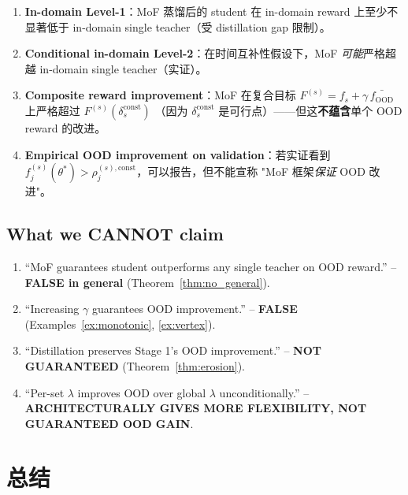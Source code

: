 \documentclass[11pt,a4paper]{article}
\newcommand{\OOD}{\mathrm{OOD}}
\newcommand{\const}{\mathrm{const}}
\theoremstyle{definition}
\begin{document}
\begin{tcolorbox}[colback=green!5,colframe=green!50!black,title=\textbf{Safe Claims}]
\begin{enumerate}[leftmargin=1.5em]
\item \textbf{In-domain Level-1}：MoF 蒸馏后的 student 在 in-domain reward
上至少不显著低于 in-domain single teacher（受 distillation gap 限制）。
\item \textbf{Conditional in-domain Level-2}：在时间互补性假设下，MoF
\emph{可能}严格超越 in-domain single teacher（实证）。
\item \textbf{Composite reward improvement}：MoF 在复合目标
$F^{(s)} = f_s + \gamma\,\bar{f_{\OOD}}$ 上严格超过 $F^{(s)}(\delta_s^\const)$
（因为 $\delta_s^\const$ 是可行点）——但这\textbf{不蕴含}单个 OOD reward 的改进。
\item \textbf{Empirical OOD improvement on validation}：若实证看到
$f_j^{(s)}(\theta^*) > \rho_j^{(s),\const}$，可以报告，但不能宣称
"MoF 框架\emph{保证} OOD 改进"。
\end{enumerate}
\end{tcolorbox}

\subsection{What we CANNOT claim}

\begin{tcolorbox}[colback=red!5,colframe=red!40!black,title=\textbf{Unsafe Claims}]
\begin{enumerate}[leftmargin=1.5em]
\item ``MoF guarantees student outperforms any single teacher on OOD reward.'' --
\textbf{FALSE in general} (Theorem~\ref{thm:no_general}).
\item ``Increasing $\gamma$ guarantees OOD improvement.'' --
\textbf{FALSE} (Examples~\ref{ex:monotonic}, \ref{ex:vertex}).
\item ``Distillation preserves Stage 1's OOD improvement.'' --
\textbf{NOT GUARANTEED} (Theorem~\ref{thm:erosion}).
\item ``Per-set $\lambda$ improves OOD over global $\lambda$ unconditionally.'' --
\textbf{ARCHITECTURALLY GIVES MORE FLEXIBILITY, NOT GUARANTEED OOD GAIN}.
\end{enumerate}
\end{tcolorbox}

\section{总结}
\label{sec:summary}
\end{document}
